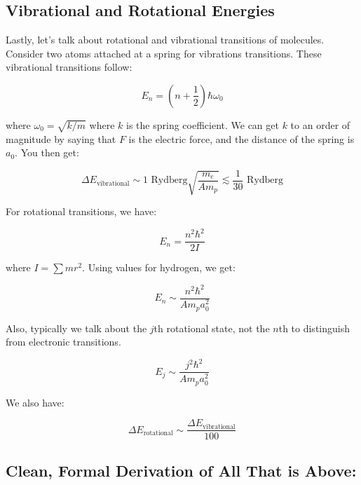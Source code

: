 \documentclass{article}
\begin{document}
\subsection{Vibrational and Rotational Energies}

Lastly, let's talk about rotational and vibrational transitions of molecules. Consider two atoms attached at a spring for vibrations transitions. These vibrational transitions follow:

\begin{equation}
    E_n = \left(n + \frac12\right) \hbar \omega_0
\end{equation}

where $\omega_0 = \sqrt{k/m}$ where $k$ is the spring coefficient. We can get $k$ to an order of magnitude by saying that $F$ is the electric force, and the distance of the spring is $a_0$. You then get:

\begin{equation}
    \Delta E_{\text{vibrational}} \sim 1 \text{ Rydberg} \sqrt{\frac{m_e}{A m_p}} \lesssim \frac{1}{30} \text{ Rydberg}
\end{equation}

For rotational transitions, we have:

\begin{equation}
    E_n = \frac{n^2 \hbar^2}{2 I}
\end{equation}

where $I = \sum mr^2$. Using values for hydrogen, we get:

\begin{equation}
    E_n \sim \frac{n^2 \hbar^2}{A m_p a_0^2}
\end{equation}

Also, typically we talk about the $j$th rotational state, not the $n$th to distinguish from electronic transitions. 

\begin{equation}
    \boxed{E_j \sim \frac{j^2 \hbar^2}{A m_p a_0^2}}
\end{equation}

We also have:

\begin{equation}
    \boxed{\Delta E_{\text{rotational}} \sim \frac{\Delta E_{\text{vibrational}}}{100}}
\end{equation}

\subsection{Clean, Formal Derivation of All That is Above:}
\end{document}
